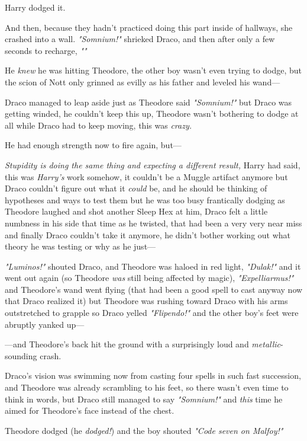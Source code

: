 Harry dodged it.

And then, because they hadn't practiced doing this part inside of hallways, she
crashed into a wall.
\sbreak
\emph{"Somnium!"} shrieked Draco, and then after only a few seconds to
recharge, \emph{""}

He \emph{knew} he was hitting Theodore, the other boy wasn't even trying to
dodge, but the scion of Nott only grinned as evilly as his father and leveled
his wand\mbox{---}

Draco managed to leap aside just as Theodore said \emph{"Somnium!"} but Draco
was getting winded, he couldn't keep this up, Theodore wasn't bothering to
dodge at all while Draco had to keep moving, this was \emph{crazy.}

He had enough strength now to fire again, but\mbox{---}

\emph{Stupidity is doing the same thing and expecting a different result,}
Harry had said, this was \emph{Harry's} work somehow, it couldn't be a Muggle
artifact anymore but Draco couldn't figure out what it \emph{could} be, and he
should be thinking of hypotheses and ways to test them but he was too busy
frantically dodging as Theodore laughed and shot another Sleep Hex at him,
Draco felt a little numbness in his side that time as he twisted, that had been
a very very near miss and finally Draco couldn't take it anymore, he didn't
bother working out what theory he was testing or why as he just\mbox{---}

\emph{"Luminos!"} shouted Draco, and Theodore was haloed in red light,
\emph{"Dulak!"} and it went out again (so Theodore \emph{was} still being
affected by magic), \emph{"Expelliarmus!"} and Theodore's wand went flying
(that had been a good spell to cast anyway now that Draco realized it) but
Theodore was rushing toward Draco with his arms outstretched to grapple so
Draco yelled \emph{"Flipendo!"} and the other boy's feet were abruptly yanked
up\mbox{---}

---and Theodore's back hit the ground with a surprisingly loud and
\emph{metallic}-sounding crash.

Draco's vision was swimming now from casting four spells in such fast
succession, and Theodore was already scrambling to his feet, so there wasn't
even time to think in words, but Draco still managed to say \emph{"Somnium!"}
and \emph{this} time he aimed for Theodore's face instead of the chest.

Theodore dodged (he \emph{dodged!}) and the boy shouted \emph{"Code seven on
Malfoy!"}


